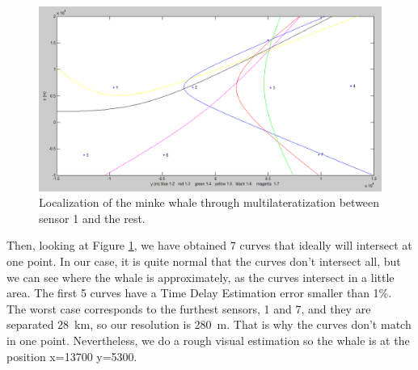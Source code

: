 \begin{figure}[htb]
	\begin{center}
		\includegraphics[width=1\textwidth]{figures/7_local.png}
	\end{center}
	\caption{Localization of the minke whale through multilateratization between sensor 1 and the rest.}
	\label{fig:local}
\end{figure}

Then, looking at Figure \ref{fig:local}, we have obtained 7 curves that ideally will intersect at one point. In our case, it is quite normal that the curves don't intersect all, but we can see where the whale is approximately, as the curves intersect in a little area. The first 5 curves have a Time Delay Estimation error smaller than 1\%. The worst case corresponds to the furthest sensors, 1 and 7, and they are separated \SI{28}{\kilo\meter}, so our resolution is \SI{280}{\meter}. That is why the curves don't match in one point. Nevertheless, we do a rough visual estimation so the whale is at the position x=13700 y=5300.
